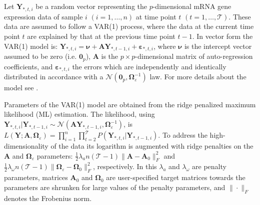 Let $\mathbf{Y}_{*,t,i}$ be a random vector representing the $p$-dimensional mRNA gene expression data of sample $i$ $(i=1,\hdots,n)$ at time point $t$ $(t=1,\hdots,\mathcal{T})$. These data are assumed to follow a VAR(1) process, where the data at the current time point $t$ are explained by that at the previous time point $t-1$. In vector form the VAR(1) model is: $\mathbf{Y}_{*,t,i}  = \boldsymbol{\nu} + \mathbf{A} \mathbf{Y}_{*,t-1,i} + \boldsymbol{\varepsilon}_{*,t,i}$, where $\boldsymbol{\nu}$ is the intercept vector assumed to be zero (i.e. $\boldsymbol{0}_{p}$), $\mathbf{A}$ is the $p \times p$-dimensional matrix of auto-regression coefficients, and $\boldsymbol{\varepsilon}_{*,t,i}$ the errors which are independently and identically distributed in accordance with a $\mathcal{N}(\boldsymbol{0}_{p}, \boldsymbol{\Omega}_{\varepsilon}^{-1})$ law. For more details about the model see \cite{Lutkepohl2005, Hamilton1994}.

Parameters of the VAR(1) model are obtained from the ridge penalized maximum likelihood (ML) estimation. The likelihood, using $\mathbf{Y}_{*,t,i}|\mathbf{Y}_{*,t-1,i}\sim\mathcal{N}(\mathbf{A}\mathbf{Y}_{*,t-1,i},\mathbf{\Omega}_{\varepsilon}^{-1})$, is $L(\mathbf{Y}; \mathbf{A}, \boldsymbol{\Omega}_{\varepsilon}) = \prod_{i=1}^n \prod_{t=2}^{\mathcal{T}}P(\mathbf{Y}_{*,t,i}|\mathbf{Y}_{*,t-1,i})$. To address the high-dimensionality of the data its logarithm is augmented with ridge penalties on the $\mathbf{A}$ and $\mathbf{\Omega}_{\varepsilon}$ parameters: $\tfrac{1}{2} \lambda_a n(\mathcal{T}-1) \| \mathbf{A} - \mathbf{A}_0 \|_F^2$ and $\tfrac{1}{2} \lambda_{\omega} n(\mathcal{T}-1) \| \mathbf{\Omega}_{\varepsilon} - \mathbf{\Omega}_0 \|_F^2$, respectively. In this $\lambda_a$ and $\lambda_{\omega}$ are penalty parameters, matrices $\mathbf{A}_0$ and $\boldsymbol{\Omega}_0$ are user-specified target matrices towards the parameters are shrunken for large values of the penalty parameters, and $\| \cdot \|_F$ denotes the Frobenius norm. 


